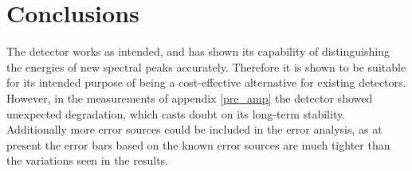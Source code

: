 \documentclass[a4paper]{article}
\begin{document}
\clearpage
\section{Conclusions}
\label{conclusions}

The detector works as intended, and has shown its capability of distinguishing the energies of new spectral peaks accurately.
Therefore it is shown to be suitable for its intended purpose of being a cost-effective alternative for existing detectors.
However, in the measurements of appendix \ref{pre_amp} the detector showed unexpected degradation, which casts doubt on its long-term stability.
Additionally more error sources could be included in the error analysis, as at present the error bars based on the known error sources are much tighter than the variations seen in the results.
\end{document}
